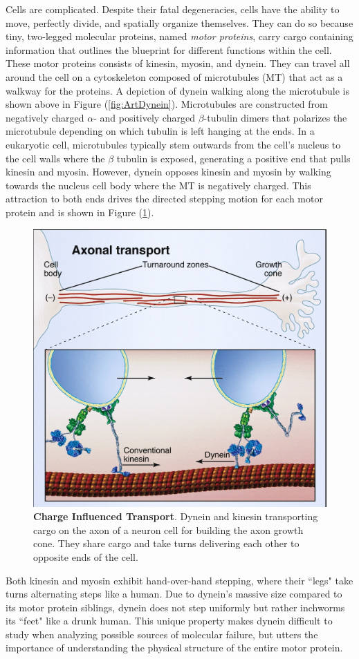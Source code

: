 Cells are complicated. Despite their fatal degeneracies, cells have the ability to move, perfectly divide, and spatially organize themselves. They can do so because tiny, two-legged molecular proteins, named \textit{motor proteins}, carry cargo containing information that outlines the blueprint for different functions within the cell. These motor proteins consists of kinesin, myosin, and dynein. They can travel all around the cell on a cytoskeleton composed of microtubules (MT) that act as a walkway for the proteins. A depiction of dynein walking along the microtubule is shown above in Figure (\ref{fig:ArtDynein}). Microtubules are constructed from negatively charged $\alpha$- and positively charged $\beta$-tubulin dimers that polarizes the microtubule depending on which tubulin is left hanging at the ends. In a eukaryotic cell, microtubules typically stem outwards from the cell's nucleus to the cell walls where the $\beta$ tubulin is exposed, generating a positive end that pulls kinesin and myosin. However, dynein opposes kinesin and myosin by walking towards the nucleus cell body where the MT is negatively charged. This attraction to both ends drives the directed stepping motion for each motor protein and is shown in Figure (\ref{fig:transport}). 

\begin{figure}[H]
	\centering
	\includegraphics[width=0.6\columnwidth]{Figures/retrograde_transport.jpg}
	\caption[Charge Influenced Transport]{\textbf{Charge Influenced Transport}. Dynein and kinesin transporting cargo on the axon of a neuron cell for building the axon growth cone. They share cargo and take turns delivering each other to opposite ends of the cell. \cite{Vale2003molecular}}
	\label{fig:transport}
\end{figure}

Both kinesin and myosin exhibit hand-over-hand stepping, where their ``legs" take turns alternating steps like a human. Due to dynein's massive size compared to its motor protein siblings, dynein does not step uniformly but rather inchworms its ``feet" like a drunk human. This unique property makes dynein difficult to study when analyzing possible sources of molecular failure, but utters the importance of understanding the physical structure of the entire motor protein.

